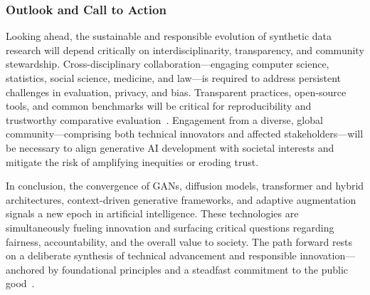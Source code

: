 \documentclass[sigconf]{acmart}
\begin{document}
\subsubsection{Outlook and Call to Action}
Looking ahead, the sustainable and responsible evolution of synthetic data research will depend critically on interdisciplinarity, transparency, and community stewardship. Cross-disciplinary collaboration---engaging computer science, statistics, social science, medicine, and law---is required to address persistent challenges in evaluation, privacy, and bias. Transparent practices, open-source tools, and common benchmarks will be critical for reproducibility and trustworthy comparative evaluation~\cite{ref74,ref75,ref97,ref102}. Engagement from a diverse, global community---comprising both technical innovators and affected stakeholders---will be necessary to align generative AI development with societal interests and mitigate the risk of amplifying inequities or eroding trust.

In conclusion, the convergence of GANs, diffusion models, transformer and hybrid architectures, context-driven generative frameworks, and adaptive augmentation signals a new epoch in artificial intelligence. These technologies are simultaneously fueling innovation and surfacing critical questions regarding fairness, accountability, and the overall value to society. The path forward rests on a deliberate synthesis of technical advancement and responsible innovation---anchored by foundational principles and a steadfast commitment to the public good~\cite{ref74,ref75,ref81,ref82,ref90,ref91,ref92,ref93,ref94,ref95,ref96,ref97,ref98,ref99,ref100,ref101,ref102}.



\end{document}
